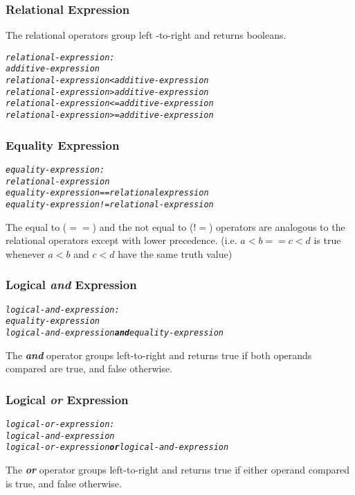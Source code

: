 \documentclass[12pt]{report}
\begin{document}
\subsubsection{Relational Expression}

The relational operators group left -to-right and returns booleans.
\begin{alltt}
         \textit{relational-expression:}
              \textit{additive-expression}
              \textit{relational-expression < additive-expression}
              \textit{relational-expression > additive-expression}
              \textit{relational-expression <= additive-expression}
              \textit{relational-expression >= additive-expression}
\end{alltt}

\subsubsection{Equality Expression}
\begin{alltt}
         \textit{equality-expression:}
              \textit{relational-expression}
              \textit{equality-expression == relational expression}
              \textit{equality-expression != relational-expression}
\end{alltt}
\begin{doublespace}
The equal to ($==$) and the not equal to ($!$$=$) operators are analogous to the relational operators except with lower precedence. (i.e. $a<b == c<d$ is true whenever $a<b$ and $c<d$ have the same truth value)
\end{doublespace}

\subsubsection{Logical \textit{and} Expression}
\begin{alltt}
         \textit{logical-and-expression:}
              \textit{equality-expression}
              \textit{logical-and-expression \textbf{and} equality-expression}
\end{alltt}
\begin{doublespace}
The \textbf{\textit{and}} operator groups left-to-right and returns true if both operands compared are true, and false otherwise.
\end{doublespace}

\subsubsection{Logical \textit{or} Expression}
\begin{alltt}
         \textit{logical-or-expression:}
              \textit{logical-and-expression}
              \textit{logical-or-expression \textbf{or} logical-and-expression}
\end{alltt}
\begin{doublespace}
The \textbf{\textit{or}} operator groups left-to-right and returns true if either operand compared is true, and false otherwise.
\end{doublespace}
\end{document}
